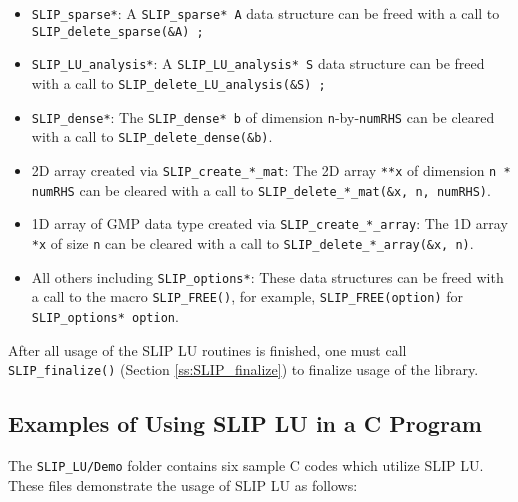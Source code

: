 \documentclass[12pt]{article}
\theoremstyle{definition}
\begin{document}
\begin{itemize}
\item \verb|SLIP_sparse*|: A \verb|SLIP_sparse* A| data structure can be freed
with a call to \verb|SLIP_delete_sparse(&A) ;|

\item \verb|SLIP_LU_analysis*|: A \verb|SLIP_LU_analysis* S| data structure can
be freed with a call to \verb|SLIP_delete_LU_analysis(&S) ;|

\item \verb|SLIP_dense*|: The \verb|SLIP_dense* b| of dimension
\verb|n|-by-\verb|numRHS| can be cleared with a call to
\verb|SLIP_delete_dense(&b)|.

\item 2D array created via \verb|SLIP_create_*_mat|: The 2D array \verb|**x| of
dimension \verb|n * numRHS| can be cleared with a call to
\verb|SLIP_delete_*_mat(&x, n, numRHS)|.

\item 1D array of GMP data type created via \verb|SLIP_create_*_array|: The 1D
array \verb|*x| of size \verb|n| can be cleared with a call to
\verb|SLIP_delete_*_array(&x, n)|.

\item All others including \verb|SLIP_options*|: These data structures can be
freed with a call to the macro \verb|SLIP_FREE()|, for example,
\verb|SLIP_FREE(option)| for \newline
\verb|SLIP_options* option|.

\end{itemize}

After all usage of the SLIP LU routines is finished, one must call
\verb|SLIP_finalize()| (Section \ref{ss:SLIP_finalize}) to finalize usage of
the library.

\cprotect\subsection{Examples of Using SLIP LU in a C Program}
\label{s:Using:Examples}

The \verb|SLIP_LU/Demo| folder contains six sample C codes which utilize SLIP
LU. These files demonstrate the usage of SLIP LU as follows:
\end{document}
